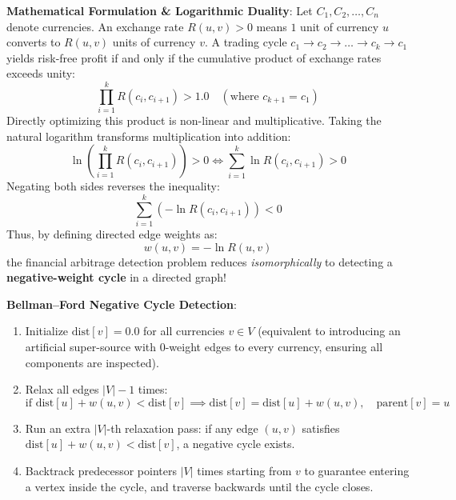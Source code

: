 \documentclass[12pt]{article}
\begin{document}
\textbf{Mathematical Formulation \& Logarithmic Duality}:
Let $C_1, C_2, \dots, C_n$ denote currencies. An exchange rate $R(u, v) > 0$ means $1$ unit of currency $u$ converts to $R(u, v)$ units of currency $v$. A trading cycle $c_1 \to c_2 \to \dots \to c_k \to c_1$ yields risk-free profit if and only if the cumulative product of exchange rates exceeds unity:
\[
\prod_{i=1}^{k} R(c_i, c_{i+1}) > 1.0 \quad (\text{where } c_{k+1} = c_1)
\]
Directly optimizing this product is non-linear and multiplicative. Taking the natural logarithm transforms multiplication into addition:
\[
\ln\left(\prod_{i=1}^{k} R(c_i, c_{i+1})\right) > 0 \iff \sum_{i=1}^{k} \ln R(c_i, c_{i+1}) > 0
\]
Negating both sides reverses the inequality:
\[
\sum_{i=1}^{k} \left(-\ln R(c_i, c_{i+1})\right) < 0
\]
Thus, by defining directed edge weights as:
\[
w(u, v) = -\ln R(u, v)
\]
the financial arbitrage detection problem reduces \textit{isomorphically} to detecting a \textbf{negative-weight cycle} in a directed graph!

\textbf{Bellman--Ford Negative Cycle Detection}:
\begin{enumerate}
    \item Initialize $\text{dist}[v] = 0.0$ for all currencies $v \in V$ (equivalent to introducing an artificial super-source with $0$-weight edges to every currency, ensuring all components are inspected).
    \item Relax all edges $|V| - 1$ times:
    \[
    \text{if } \text{dist}[u] + w(u, v) < \text{dist}[v] \implies \text{dist}[v] = \text{dist}[u] + w(u, v), \quad \text{parent}[v] = u
    \]
    \item Run an extra $|V|$-th relaxation pass: if any edge $(u, v)$ satisfies $\text{dist}[u] + w(u, v) < \text{dist}[v]$, a negative cycle exists.
    \item Backtrack predecessor pointers $|V|$ times starting from $v$ to guarantee entering a vertex inside the cycle, and traverse backwards until the cycle closes.
\end{enumerate}
\end{document}

